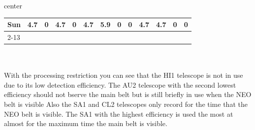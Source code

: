 \documentclass{article}
\begin{document}
\begin{adjustbox}{center}
\begin{tabular}{lcccccccccccc}
\multicolumn{1}{l|}{{ Sun}}                                       & \multicolumn{1}{c|}{{ 4.7}}                                  & \multicolumn{1}{c|}{{ 0}}                                     & \multicolumn{1}{c|}{{ 4.7}}                                  & \multicolumn{1}{c|}{{ 0}}                                     & \multicolumn{1}{c|}{{ 4.7}}                                  & \multicolumn{1}{c|}{{ 5.9}}                                   & \multicolumn{1}{c|}{{ 0}}                                    & \multicolumn{1}{c|}{{ 0}}                                     & \multicolumn{1}{c|}{{ 4.7}}                                  & \multicolumn{1}{c|}{{ 4.7}}                                   & \multicolumn{1}{c|}{{ 0}}                                    & \multicolumn{1}{c|}{{ 0}}                                     \\ \cline{2-13} 
\end{tabular}
\end{adjustbox}
\\\\
With the processing restriction you can see that the HI1 telescope is not in use due to its low detection efficiency.
The AU2 telescope with the second lowest efficiency should not bserve the main belt but is still briefly in use when the NEO belt is visible
Also the SA1 and CL2 telescopes only record for the time that the NEO belt is visible.
The SA1 with the highest efficiency is used the most at almost for the maximum time the main belt is visible.
\end{document}
